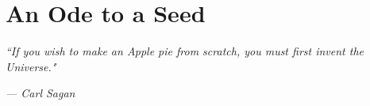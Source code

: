 \documentclass[../main]{subfiles}
\begin{document}
\chapter{An Ode to a Seed} \label{chp:logo}

\epigraph{
    \itshape
    ``If you wish to make an Apple pie from scratch,
    you must first invent the Universe."
}{\textit{--- Carl Sagan}}








\end{document}
